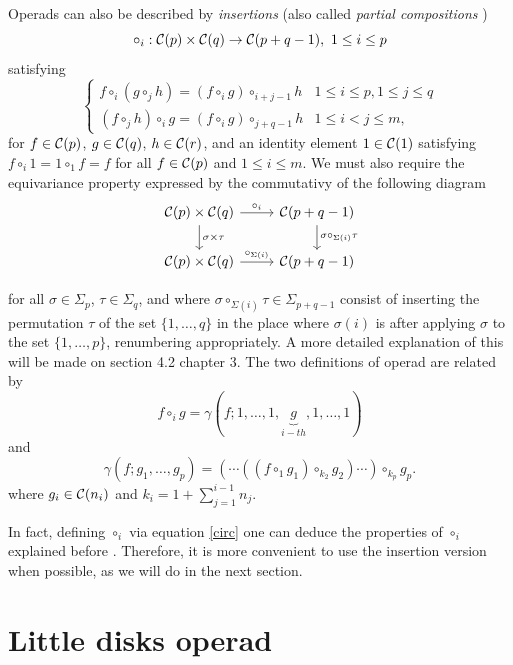 \documentclass[TFM.tex]{subfiles}
\begin{document}
Operads can also be described by \emph{insertions} (also called \emph{partial compositions} \cite{das})
\[
\circ_i:\mathcal{C}(p)\times\mathcal{C}(q)\to \mathcal{C}(p+q-1),\ 1\leq i\leq p
\]
satisfying 
\[
\begin{cases}
f\circ_i(g\circ_j h)=(f\circ_i g)\circ_{i+j-1} h & 1\leq i\leq p, 1\leq j\leq q\\
(f\circ_j h)\circ_i g=(f\circ_i g)\circ_{j+q-1}h & 1\leq i<j\leq m,
\end{cases}
\]
for $f\in\mathcal{C}(p)$, $g\in\mathcal{C}(q)$, $h\in\mathcal{C}(r)$, and an identity element $1\in\mathcal{C}(1)$ satisfying $f\circ_i 1=1\circ_1 f=f$ for all $f\in\mathcal{C}(p)$ and $1\leq i\leq m$. We must also require the equivariance property expressed by the commutativy of the following diagram
\[
\begin{tikzcd}
\CC(p)\times \CC(q)\arrow[r, "\circ_i"]\arrow[d, "\sigma\times\tau"] & \CC(p+q-1)\arrow[d, "\sigma\circ_{\Sigma(i)}\tau"]\\
\CC(p)\times\CC(q)\arrow[r, "\circ_{\Sigma(i)}"] & \CC(p+q-1)
\end{tikzcd}
\]

for all $\sigma\in\Sigma_p$, $\tau\in\Sigma_q$, and where $\sigma\circ_{\Sigma(i)}\tau\in\Sigma_{p+q-1}$ consist of inserting the permutation $\tau$ of the set $\{1,\dots, q\}$ in the place where $\sigma(i)$ is after applying $\sigma$ to the set $\{1,\dots, p\}$, renumbering appropriately. A more detailed explanation of this will be made on section 4.2 chapter 3. The two definitions of operad are related by
\begin{equation}\label{circ}
f\circ_i g=\gamma(f;1,\dots, 1,\underbrace{g}_{i-th},1,\dots, 1)
\end{equation}
and
\[
\gamma(f;g_1,\dots, g_p)= (\cdots((f\circ_1 g_{1})\circ_{k_2} g_{2})\cdots)\circ_{k_p} g_p.
\]
where $g_i\in\mathcal{C}(n_i)$ and $k_i=1+\sum_{j=1}^{i-1}n_j$.

In fact, defining $\circ_i$ via equation \ref{circ} one can deduce the properties of $\circ_i$ explained before \cite[Chapter 2]{teich}. Therefore, it is more convenient to use the insertion version when possible, as we will do in the next section. 



\section{Little disks operad}\label{little}
 
\end{document}
